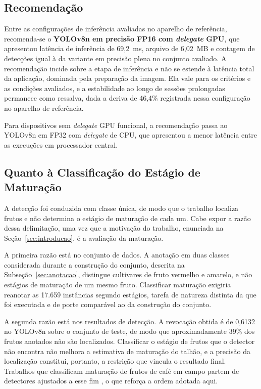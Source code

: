\documentclass[artigo,times,capa]{iftex2024}
\begin{document}
\subsection{Recomendação}

Entre as configurações de inferência avaliadas no aparelho de referência, recomenda-se o \textbf{YOLOv8n em precisão \ac{FP16} com \textit{delegate} \ac{GPU}}, que apresentou latência de inferência de 69,2~ms, arquivo de 6,02~MB e contagem de detecções igual à da variante em precisão plena no conjunto avaliado. A recomendação incide sobre a etapa de inferência e não se estende à latência total da aplicação, dominada pela preparação da imagem. Ela vale para os
critérios e as condições avaliados, e a estabilidade ao longo de sessões
prolongadas permanece como ressalva, dada a deriva de 46,4\% registrada nessa
configuração no aparelho de referência.

Para dispositivos sem \textit{delegate} \ac{GPU} funcional, a recomendação passa ao YOLOv8n em \ac{FP32} com \textit{delegate} de \ac{CPU}, que apresentou a menor latência entre as execuções em processador central.

\subsection{Quanto à Classificação do Estágio de Maturação}
\label{sec:quanto_maturacao}

A detecção foi conduzida com classe única, de modo que o trabalho localiza frutos e não determina o estágio de maturação de cada um. Cabe expor a razão dessa delimitação, uma vez que a motivação do
trabalho, enunciada na Seção~\ref{sec:introducao}, é a avaliação da
maturação.

A primeira razão está no conjunto de dados. A anotação em duas classes considerada durante a construção do conjunto, descrita na Subseção~\ref{sec:anotacao}, distingue cultivares de fruto vermelho e amarelo, e não estágios de maturação de um mesmo fruto. Classificar maturação exigiria reanotar as 17.659 instâncias segundo estágios, tarefa de natureza distinta da que foi executada e de porte comparável ao da construção do conjunto.

A segunda razão está nos resultados de detecção. A revocação obtida é de 0,6132 no YOLOv8n sobre o conjunto de teste, de modo que aproximadamente 39\% dos frutos anotados não são localizados. Classificar o estágio de frutos que o detector não encontra não melhora a estimativa de maturação do talhão, e a precisão da localização constitui, portanto, a restrição que vincula o resultado final. Trabalhos que classificam maturação de frutos de café em campo partem de detectores ajustados a esse fim \cite{Ye2025ASD, Kazama2024Monitoring}, o que reforça a ordem adotada aqui.
\end{document}
